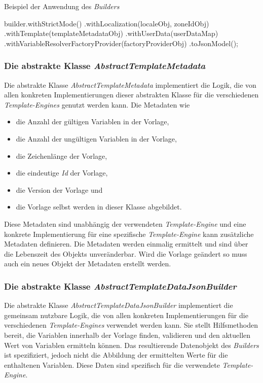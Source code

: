 \begin{program}[h]
\caption{Beispiel der Anwendung des \emph{Builders}}
\label{prog:templateDataJsonBuilder-example}
\begin{JavaCode}
builder.withStrictMode() 
       .withLocalization(localeObj, zoneIdObj)
       .withTemplate(templateMetadataObj)
       .withUserData(userDataMap)
       .withVariableResolverFactoryProvider(factoryProviderObj)
       .toJsonModel();
\end{JavaCode}
\end{program}

\subsubsection{Die abstrakte Klasse \emph{AbstractTemplateMetadata}}
\label{sec:abstractTemplateMetadata}
Die abstrakte Klasse \emph{AbstractTemplateMetadata} implementiert die Logik, die von allen konkreten Implementierungen dieser abstrakten Klasse für die verschiedenen \emph{Template-Engines} genutzt werden kann. Die Metadaten wie
\begin{itemize}
	\item die Anzahl der gültigen Variablen in der Vorlage,
	\item die Anzahl der ungültigen Variablen in der Vorlage,
	\item die Zeichenlänge der Vorlage,
	\item die eindeutige \emph{Id} der Vorlage,
	\item die Version der Vorlage und
	\item die Vorlage selbst werden in dieser Klasse abgebildet. 
\end{itemize}
Diese Metadaten sind unabhängig der verwendeten \emph{Template-Engine} und eine konkrete Implementierung für eine spezifische \emph{Template-Engine} kann zusätzliche Metadaten definieren. Die Metadaten werden einmalig ermittelt und sind über die Lebenszeit des Objekts unveränderbar. Wird die Vorlage geändert so muss auch ein neues Objekt der Metadaten erstellt werden.

\subsubsection{Die abstrakte Klasse \emph{AbstractTemplateDataJsonBuilder}}
\label{sec:abstractTemplateDataJsonBuilder}
Die abstrakte Klasse \emph{AbstractTemplateDataJsonBuilder} implementiert die gemeinsam nutzbare Logik, die von allen konkreten Implementierungen für die verschiedenen \emph{Template-Engines} verwendet werden kann. Sie stellt Hilfsmethoden bereit, die Variablen innerhalb der Vorlage finden, validieren und den aktuellen Wert von Variablen ermitteln können. Das resultierende Datenobjekt des \emph{Builders} ist spezifiziert, jedoch nicht die Abbildung der ermittelten Werte für die enthaltenen Variablen. Diese Daten sind spezifisch für die verwendete \emph{Template-Engine}.

